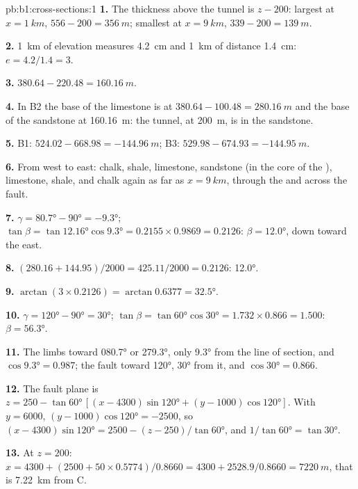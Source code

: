 \begin{solution}{pb:b1:cross-sections:1}
\textbf{1.} The thickness above the tunnel is $z - 200$: largest at
$x = \qty{1}{km}$, $556 - 200 = \qty{356}{m}$; smallest at $x =
\qty{9}{km}$, $339 - 200 = \qty{139}{m}$.

\textbf{2.} \qty{1}{km} of elevation measures \qty{4.2}{cm} and \qty{1}{km}
of distance \qty{1.4}{cm}: $e = 4.2/1.4 = 3$.

\textbf{3.} $380.64 - 220.48 = \qty{160.16}{m}$.

\textbf{4.} In B2 the base of the limestone is at $380.64 - 100.48 =
\qty{280.16}{m}$ and the base of the sandstone at \qty{160.16}{m}: the
tunnel, at \qty{200}{m}, is in the sandstone.

\textbf{5.} B1: $524.02 - 668.98 = \qty{-144.96}{m}$; B3: $529.98 - 674.93 =
\qty{-144.95}{m}$.

\textbf{6.} From west to east: chalk, shale, limestone, sandstone (in the core
of the ), limestone, shale, and chalk again as far as
$x = \qty{9}{km}$, through the  and across the fault.

\textbf{7.} $\gamma = \ang{80.7} - \ang{90} = \ang{-9.3}$; $\tan\beta =
\tan\ang{12.16}\cos\ang{9.3} = 0.2155\times0.9869 = 0.2126$: $\beta =
\ang{12.0}$, down toward the east.

\textbf{8.} $(280.16 + 144.95)/2000 = 425.11/2000 = 0.2126$: \ang{12.0}.

\textbf{9.} $\arctan(3\times0.2126) = \arctan 0.6377 = \ang{32.5}$.

\textbf{10.} $\gamma = \ang{120} - \ang{90} = \ang{30}$; $\tan\beta =
\tan\ang{60}\cos\ang{30} = 1.732\times0.866 = 1.500$: $\beta = \ang{56.3}$.

\textbf{11.} The limbs  toward \ang{080.7} or \ang{279.3}, only
\ang{9.3} from the line of section, and $\cos\ang{9.3} = 0.987$; the fault
 toward \ang{120}, \ang{30} from it, and $\cos\ang{30} = 0.866$.

\textbf{12.} The fault plane is $z = 250 - \tan\ang{60}\,[(x - 4300)
\sin\ang{120} + (y - 1000)\cos\ang{120}]$. With $y = 6000$, $(y - 1000)
\cos\ang{120} = -2500$, so $(x - 4300)\sin\ang{120} = 2500 - (z - 250)/
\tan\ang{60}$, and $1/\tan\ang{60} = \tan\ang{30}$.

\textbf{13.} At $z = 200$: $x = 4300 + (2500 + 50\times0.5774)/0.8660 =
4300 + 2528.9/0.8660 = \qty{7220}{m}$, that is \qty{7.22}{km} from C.


\end{solution}
